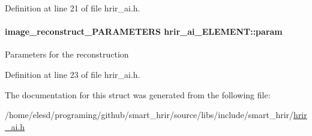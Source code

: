 Definition at line 21 of file hrir\-\_\-ai.\-h.

\hypertarget{a00001_a2a1fa3a3c0603cdb8f577b070f7b6432}{
\paragraph[{param}]{\setlength{\rightskip}{0pt plus 5cm}image\-\_\-reconstruct\-\_\-\-P\-A\-R\-A\-M\-E\-T\-E\-R\-S hrir\-\_\-ai\-\_\-\-E\-L\-E\-M\-E\-N\-T\-::param}}\label{a00001_a2a1fa3a3c0603cdb8f577b070f7b6432}
Parameters for the reconstruction 

Definition at line 23 of file hrir\-\_\-ai.\-h.



The documentation for this struct was generated from the following file\-:\begin{DoxyCompactItemize}
\item 
/home/elesd/programing/github/smart\-\_\-hrir/source/libs/include/smart\-\_\-hrir/\hyperlink{a00004}{hrir\-\_\-ai.\-h}\end{DoxyCompactItemize}
